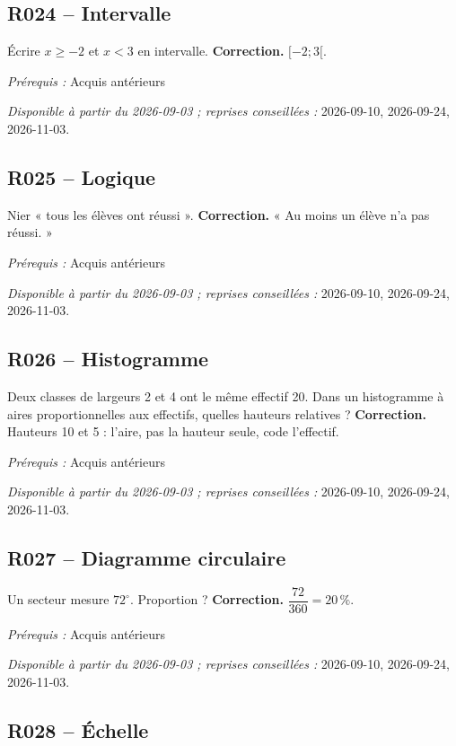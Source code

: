 \subsection*{R024 -- Intervalle}\label{R024}
Écrire $x\geq-2$ et $x<3$ en intervalle.
\ifprof\textbf{Correction.} $[-2;3[$.\par\textit{Prérequis :} Acquis antérieurs\par\textit{Disponible à partir du 2026-09-03 ; reprises conseillées :} 2026-09-10, 2026-09-24, 2026-11-03.\fi
{}\subsection*{R025 -- Logique}\label{R025}
Nier « tous les élèves ont réussi ».
\ifprof\textbf{Correction.} « Au moins un élève n’a pas réussi. »\par\textit{Prérequis :} Acquis antérieurs\par\textit{Disponible à partir du 2026-09-03 ; reprises conseillées :} 2026-09-10, 2026-09-24, 2026-11-03.\fi
{}\subsection*{R026 -- Histogramme}\label{R026}
Deux classes de largeurs 2 et 4 ont le même effectif 20. Dans un histogramme à aires proportionnelles aux effectifs, quelles hauteurs relatives ?
\ifprof\textbf{Correction.} Hauteurs 10 et 5 : l’aire, pas la hauteur seule, code l’effectif.\par\textit{Prérequis :} Acquis antérieurs\par\textit{Disponible à partir du 2026-09-03 ; reprises conseillées :} 2026-09-10, 2026-09-24, 2026-11-03.\fi
{}\subsection*{R027 -- Diagramme circulaire}\label{R027}
Un secteur mesure $72^\circ$. Proportion ?
\ifprof\textbf{Correction.} $\dfrac{72}{360}=20\,\%$.\par\textit{Prérequis :} Acquis antérieurs\par\textit{Disponible à partir du 2026-09-03 ; reprises conseillées :} 2026-09-10, 2026-09-24, 2026-11-03.\fi
{}\subsection*{R028 -- Échelle}\label{R028}
